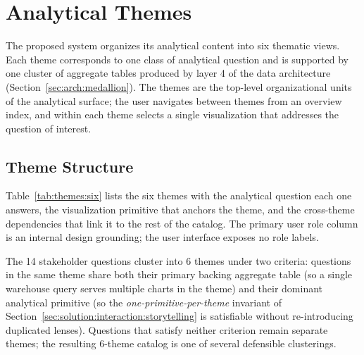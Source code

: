 \section{Analytical Themes}
\label{sec:solution:themes}

The proposed system organizes its analytical content into six thematic
views. Each theme corresponds to one class of analytical question and is
supported by one cluster of aggregate tables produced by layer 4 of the data
architecture (Section~\ref{sec:arch:medallion}). The themes are the
top-level organizational units of the analytical surface; the user
navigates between themes from an overview index, and within each theme
selects a single visualization that addresses the question of interest.

\subsection{Theme Structure}
\label{sec:solution:themes:six}

Table~\ref{tab:themes:six} lists the six themes with the analytical
question each one answers, the visualization primitive that anchors the
theme, and the cross-theme dependencies that link it to the rest of the
catalog. The primary user role column is an internal design grounding;
the user interface exposes no role labels.

The 14 stakeholder questions cluster into 6 themes under two
criteria: questions in the same theme share both their primary backing
aggregate table (so a single warehouse query serves multiple charts in
the theme) and their dominant analytical primitive (so the
\emph{one-primitive-per-theme} invariant of
Section~\ref{sec:solution:interaction:storytelling} is satisfiable
without re-introducing duplicated lenses). Questions that satisfy
neither criterion remain separate themes; the resulting 6-theme
catalog is one of several defensible clusterings.


